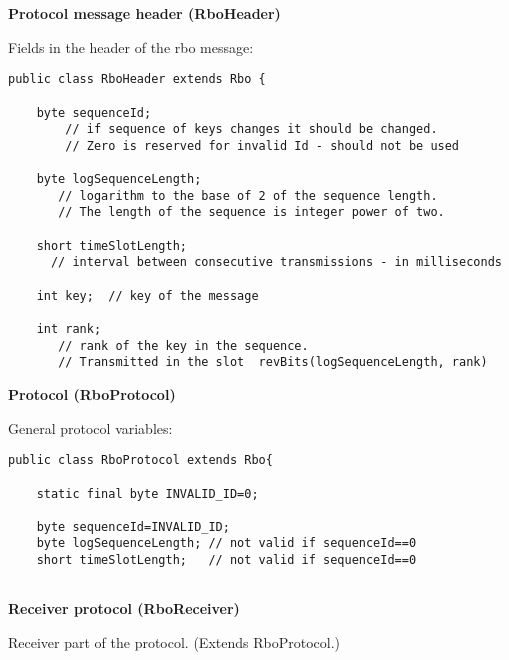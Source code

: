 \documentclass{letter}
\newcommand{\subsection}[1]{\medskip\bigskip

\noindent\textbf{\Large #1}}
\begin{document}
\subsection{Protocol message header (RboHeader)}

Fields in the header of the rbo message:
\begin{verbatim}
public class RboHeader extends Rbo {

    byte sequenceId;
        // if sequence of keys changes it should be changed. 
        // Zero is reserved for invalid Id - should not be used 

    byte logSequenceLength; 
       // logarithm to the base of 2 of the sequence length. 
       // The length of the sequence is integer power of two.

    short timeSlotLength;   
      // interval between consecutive transmissions - in milliseconds

    int key;  // key of the message

    int rank; 
       // rank of the key in the sequence. 
       // Transmitted in the slot  revBits(logSequenceLength, rank)

\end{verbatim}

\subsection{Protocol (RboProtocol)}

General protocol variables:
\begin{verbatim}
public class RboProtocol extends Rbo{

    static final byte INVALID_ID=0;

    byte sequenceId=INVALID_ID;
    byte logSequenceLength; // not valid if sequenceId==0
    short timeSlotLength;   // not valid if sequenceId==0


\end{verbatim}

\subsection{Receiver protocol (RboReceiver)}

Receiver part of the protocol. (Extends RboProtocol.)
\end{document}
